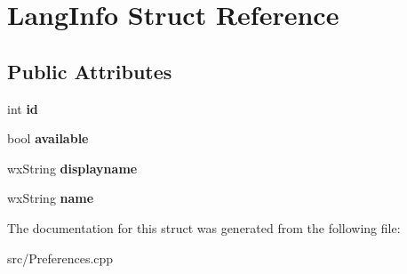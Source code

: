 \section{LangInfo Struct Reference}
\label{structLangInfo}
\subsection*{Public Attributes}
\begin{DoxyCompactItemize}
\item 
int {\bfseries id}\label{structLangInfo_a9ee053f8205e709cb0ed1308400d2705}

\item 
bool {\bfseries available}\label{structLangInfo_aaafbfa3dc3123b876d69ccbc35b69b5f}

\item 
wxString {\bfseries displayname}\label{structLangInfo_a90c4db6cd1a7ffb900306fa1001b5fa6}

\item 
wxString {\bfseries name}\label{structLangInfo_ac965e452a8535714d22a48f0de0dc135}

\end{DoxyCompactItemize}


The documentation for this struct was generated from the following file:\begin{DoxyCompactItemize}
\item 
src/Preferences.cpp\end{DoxyCompactItemize}
